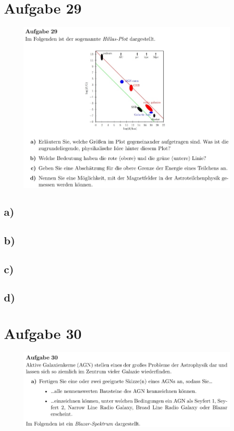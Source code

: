 \section{Aufgabe 29}

\begin{figure}[H]
    \centering
    \includegraphics[width=\textwidth]{images/Aufgabe29.jpg}
\end{figure}

\subsection{a)}

\subsection{b)}

\subsection{c)}

\subsection{d)}

\section{Aufgabe 30}

\begin{figure}[H]
    \centering
    \includegraphics[width=\textwidth]{images/Aufgabe30a.jpg}
\end{figure}

